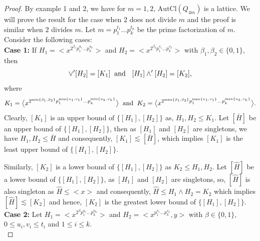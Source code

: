 \documentclass{article}
\theoremstyle{definition}
\begin{document}
    \begin{proof}
    By example 1 and 2, we have for $m=1,2$, $\text{AutCl}(Q_{4m})$ is a lattice. We will prove the result for the case when $2$ does not divide $m$ and the proof is similar when $2$ divides $m$. Let $m=p_1^{t_1}\dots p_{k}^{t_k}$ be the prime factorization of $m$. Consider the following cases: \vspace{0.2cm}\\
        \textbf{Case 1:} If $H_1=\bigl<x^{2^{\beta_1}{p_1^{u_1}}\dots p_k^{u_k}}\bigr>$ and $H_2=\bigl<x^{2^{\beta_2}{p_1^{v_1}}\dots p_k^{v_k}}\bigr>$ with $\beta_1,\beta_2 \in \{0,1\}$, then \begin{equation*}
            [H_1]\vee' [H_2]=[K_1] \hspace{0.2cm} \text{and }\hspace{0.2cm} [H_1]\wedge' [H_2]=[K_2], 
        \end{equation*}
        where \begin{equation*}
            K_1=\bigl<x^{2^{\min\{\beta_1,\beta_2\}}p_1^{\min\{u_1,v_1\}}\dots p_k^{\min\{u_k,v_k\}}}\bigr> \hspace{0.2cm} \text{and} \hspace{0.2cm} K_2=\bigl<x^{2^{\max\{\beta_1,\beta_2\}}p_1^{\max\{u_1,v_1\}}\dots p_k^{\max\{u_k,v_k\}}}\bigr>.
        \end{equation*}
        Clearly, $[K_1]$ is an upper bound of $\{[H_1],[H_2]\}$ as, $H_1,H_2\le K_1$. Let $[\bar H]$ be an upper bound of $\{[H_1],[H_2]\}$, then as $[H_1]$ and $[H_2]$ are singletons, we have $H_1,H_2\le \bar H$ and consequently, $[K_1]\lesssim [\bar H]$, which implies $[K_1] $ is the least upper bound of $\{[H_1],[H_2]\}$. \par
        Similarly, $[K_2]$ is a lower bound of $\{[H_1],[H_2]\}$ as $K_2\le H_1,H_2$. Let $[\widehat H]$ be a lower bound of $\{[H_1],[H_2]\}$, as $[H_1]$ and $[H_2]$ are singletons, so, $[\widehat H]$ is also singleton as $\widehat H\le \bigl<x\bigr>$ and consequently, $\widehat H \le H_1\wedge H_2=K_2$ which implies $[\widehat H]\lesssim [K_2]$ and hence, $[K_2]$ is the greatest lower bound of $\{[H_1],[H_2]\}.$ \vspace{0.1cm}\\
        \textbf{Case 2:} Let $H_1=\bigl<x^{2^{\beta}{p_1^{u_1}}\dots p_k^{u_k}}\bigr>$ and $H_2=\bigl<x^{p_1^{v_1}\dots p_k^{v_k}},y\bigr>$ with $\beta \in \{0,1\}$, $0\le u_i,v_i\le t_i$ and $1\le i\le k$. \vspace{0.2cm}\\

\end{proof}
\end{document}
